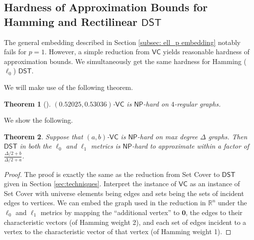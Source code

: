 \documentclass{article}\providecommand{\DeclareRedundantLanguages}[2]{}\usepackage[a4paper,margin=20mm]{geometry}
\newtheorem{theorem}{Theorem}\newtheorem{lemma}[theorem]{Lemma}\newtheorem{proposition}[theorem]{Proposition}\newtheorem{corollary}[theorem]{Corollary}\newtheorem{definition}[theorem]{Definition}\newtheorem{claim}[theorem]{Claim}\newtheorem{remark}[theorem]{Remark}\newtheorem{observation}[theorem]{Observation}\newtheorem{conjecture}[theorem]{Conjecture}\newtheorem{example}[theorem]{Example}
\newcommand{\R}{\mathbb{R}}
\newcommand{\1}{\textbf{1}}
\newcommand{\dst}{$\mathsf{DST}$\xspace}
\newcommand{\np}{$\mathsf{NP}$\xspace}
\newcommand{\vcov}{$\mathsf{VC}$\xspace}
\begin{document}
\subsection{Hardness of Approximation Bounds for Hamming and Rectilinear \texorpdfstring{\dst}{DST}}
The general embedding described in Section \ref{subsec: ell_p embedding} notably fails for $p = 1$. However, a simple reduction from \vcov yields reasonable hardness of approximation bounds. We simultaneously get the same hardness for Hamming ($\ell_0$) \dst. 

We will make use of the following theorem.

\begin{theorem} [\cite{Chlebik_Chlebikova_2006}] \label{thm: vcov hard}
$(0.52025, 0.53036)$-\vcov is \np-hard on $4$-regular graphs.
\end{theorem}


We show the following.

\begin{theorem} \label{thm: vx cover corr}
Suppose that $(a, b)$-\vcov is \np-hard on max degree $\Delta$ graphs. Then  \dst in both the $\ell_0$ and $\ell_1$ metrics is \np-hard to approximate within a factor of
$\frac{\Delta/2 + b}{\Delta/2 + a}$.
\end{theorem}
\begin{proof}
The proof is exactly the same as the reduction from Set Cover to \dst given in Section \ref{sec:techniques}. Interpret the instance of \vcov as an instance of Set Cover with universe elements being edges and sets being the sets of incident edges to vertices. We can embed the graph used in the reduction in $\R^n$ under the $\ell_0$ and $\ell_1$ metrics by mapping the ``additional vertex'' to $\mathbf{0}$, the edges to their characteristic vectors (of Hamming weight 2), and each set of edges incident to a vertex to the characteristic vector of that vertex (of Hamming weight 1).
\end{proof}
\end{document}
